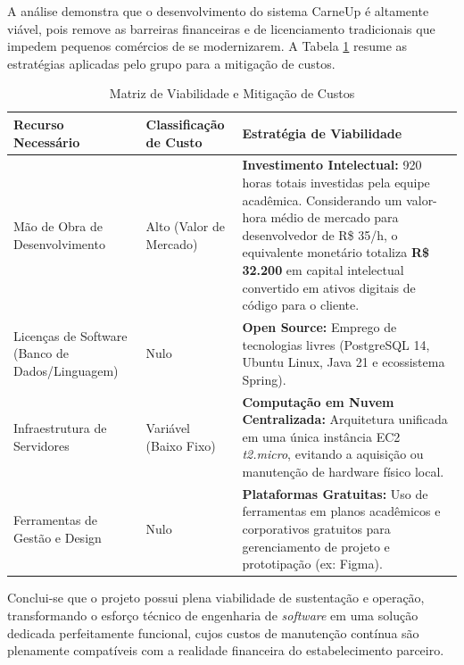 \documentclass[
	12pt,				%
	openany,			%
	oneside,			%
	a4paper,			%
	english,			%
	french,				%
	spanish,			%
	brazil				%
	]{abntex2}
\begin{document}
A análise demonstra que o desenvolvimento do sistema CarneUp é altamente viável, pois remove as barreiras financeiras e de licenciamento tradicionais que impedem pequenos comércios de se modernizarem. A Tabela \ref{tab:analise_viabilidade} resume as estratégias aplicadas pelo grupo para a mitigação de custos.

\begin{table}[H]
    \caption{Matriz de Viabilidade e Mitigação de Custos}
    \label{tab:analise_viabilidade}
    \centering
    \begin{tabular}{|p{4cm}|p{5cm}|p{5cm}|}
        \hline
        \textbf{Recurso Necessário} & \textbf{Classificação de Custo} & \textbf{Estratégia de Viabilidade} \\
        \hline
        Mão de Obra de Desenvolvimento & Alto (Valor de Mercado) & \textbf{Investimento Intelectual:} 920 horas totais investidas pela equipe acadêmica. Considerando um valor-hora médio de mercado para desenvolvedor de R\$ 35/h, o equivalente monetário totaliza \textbf{R\$ 32.200} em capital intelectual convertido em ativos digitais de código para o cliente. \\
        \hline
        Licenças de Software (Banco de Dados/Linguagem) & Nulo & \textbf{Open Source:} Emprego de tecnologias livres (PostgreSQL 14, Ubuntu Linux, Java 21 e ecossistema Spring). \\
        \hline
        Infraestrutura de Servidores & Variável (Baixo Fixo) & \textbf{Computação em Nuvem Centralizada:} Arquitetura unificada em uma única instância EC2 \textit{t2.micro}, evitando a aquisição ou manutenção de hardware físico local. \\
        \hline
        Ferramentas de Gestão e Design & Nulo & \textbf{Plataformas Gratuitas:} Uso de ferramentas em planos acadêmicos e corporativos gratuitos para gerenciamento de projeto e prototipação (ex: Figma). \\
        \hline
    \end{tabular}
\end{table}

Conclui-se que o projeto possui plena viabilidade de sustentação e operação, transformando o esforço técnico de engenharia de \textit{software} em uma solução dedicada perfeitamente funcional, cujos custos de manutenção contínua são plenamente compatíveis com a realidade financeira do estabelecimento parceiro.

\end{document}
